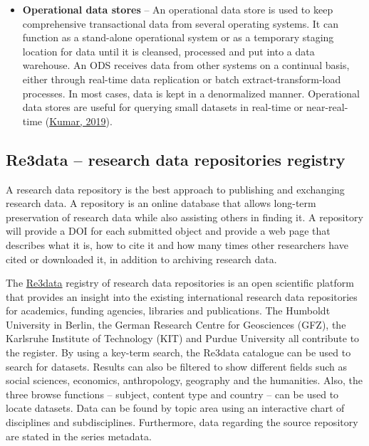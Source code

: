\documentclass[
]{book}
\begin{document}
\begin{itemize}
\item
  \textbf{Operational data stores} -- An operational data store is used to keep comprehensive transactional data from several operating systems. It can function as a stand-alone operational system or as a temporary staging location for data until it is cleansed, processed and put into a data warehouse. An ODS receives data from other systems on a continual basis, either through real-time data replication or batch extract-transform-load processes. In most cases, data is kept in a denormalized manner. Operational data stores are useful for querying small datasets in real-time or near-real-time (\href{https://stealthbits.com/blog/what-is-a-data-repository-and-what-is-it-used-for/}{Kumar, 2019}).
\end{itemize}

\hypertarget{re3data-research-data-repositories-registry}{%
\subsection*{Re3data -- research data repositories registry}\label{re3data-research-data-repositories-registry}}

A research data repository is the best approach to publishing and exchanging research data. A repository is an online database that allows long-term preservation of research data while also assisting others in finding it. A repository will provide a DOI for each submitted object and provide a web page that describes what it is, how to cite it and how many times other researchers have cited or downloaded it, in addition to archiving research data.

The \href{https://www.re3data.org/}{Re3data} registry of research data repositories is an open scientific platform that provides an insight into the existing international research data repositories for academics, funding agencies, libraries and publications. The Humboldt University in Berlin, the German Research Centre for Geosciences (GFZ), the Karlsruhe Institute of Technology (KIT) and Purdue University all contribute to the register. By using a key-term search, the Re3data catalogue can be used to search for datasets. Results can also be filtered to show different fields such as social sciences, economics, anthropology, geography and the humanities. Also, the three browse functions -- subject, content type and country -- can be used to locate datasets. Data can be found by topic area using an interactive chart of disciplines and subdisciplines. Furthermore, data regarding the source repository are stated in the series metadata.
\end{document}
